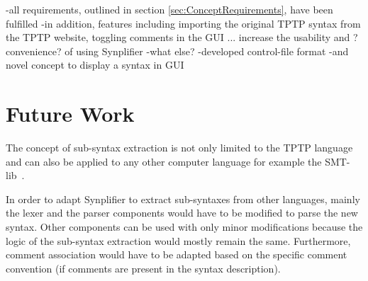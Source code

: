 -all requirements, outlined in section \ref{sec:ConceptRequirements}, have been fulfilled
-in addition, features including importing the original \ac{TPTP} syntax from the \ac{TPTP} website, toggling comments in the GUI ... increase the usability and ?convenience? of using \ac{Synplifier}
-what else?
-developed control-file format
-and novel concept to display a syntax in GUI
%
%
%
%

\section{Future Work}\label{sec:FutureWork}

The concept of sub-syntax extraction is not only limited to the \ac{TPTP} language and can also be applied to any other computer language for example the SMT-lib~\cite{BFT-SMTLIB-17}.

In order to adapt \ac{Synplifier} to extract sub-syntaxes from other languages, mainly the lexer and the parser components would have to be modified to parse the new syntax. Other components can be used with only minor modifications because the logic of the sub-syntax extraction would mostly remain the same.
Furthermore, comment association would have to be adapted based on the specific comment convention (if comments are present in the syntax description).

